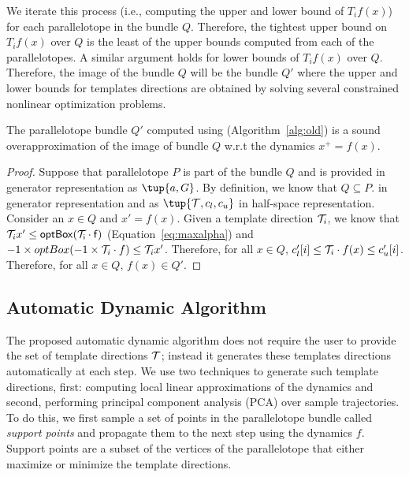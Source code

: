 We iterate this process (i.e., computing the upper and lower bound of $T_{i}f(x)$) for each parallelotope in the bundle $Q$.
%
%
Therefore, the tightest upper bound on $T_{i}f(x)$ over $Q$ is the least of the upper bounds computed from each of the parallelotopes.
%
A similar argument holds for lower bounds of $T_{i}f(x)$ over $Q$.
%
Therefore, the image of the bundle $Q$ will be the bundle $Q'$ where the upper and lower bounds for templates directions are obtained by solving several constrained nonlinear optimization problems.

\begin{lemma}
\label{lem:correctness}
The parallelotope bundle $Q'$ computed using \tbundle (Algorithm~\ref{alg:old}) is a sound overapproximation of the image of bundle $Q$ w.r.t the dynamics $x^{+} = f(x)$.
\end{lemma}
\begin{proof}
     Suppose that parallelotope $P$ is part of the bundle $Q$ and is provided in generator representation as $\tup{a, G}$.
%
By definition, we know that $Q \subseteq P$.
%
in generator representation and as $\tup{\T, c_{l}, c_{u}}$ in half-space representation.
%
Consider an $x \in Q$ and $x' = f(x)$.
%
Given a template direction ${\cal T}_{i}$, we know that ${\cal T}_{i} x' \leq \mathsf{optBox({\cal T}_{i} \cdot f)}$ (Equation~\ref{eq:maxalpha}) and $-1\times optBox(-1\times {\cal T}_{i} \cdot f) \leq {\cal T}_{i} x'$.
%
Therefore, for all $x \in Q$, $c_{l}'[i] \leq {\cal T}_{i} \cdot f(x) \leq c_{u}'[i]$.
%
Therefore, for all $x \in Q$, $f(x) \in Q'$.
\end{proof}




\vspace{-1.5em}
\subsection{Automatic Dynamic Algorithm}

The proposed automatic dynamic algorithm does not require the user to provide the set of template directions ${\cal T}$; instead it generates these templates directions automatically at each step.
%
We use two techniques to generate such template directions, first: computing local linear approximations of the dynamics and second, performing principal component analysis (PCA) over sample trajectories.
%
To do this, we first sample a set of points in the parallelotope bundle called \emph{support points} and propagate them to the next step using the dynamics $f$.
%
Support points are a subset of the vertices of the parallelotope that either maximize or minimize the template directions.

